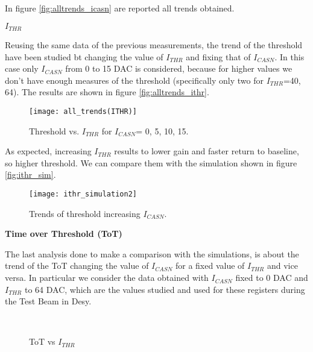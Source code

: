 In figure \vref{fig:alltrends_icasn} are reported all trends obtained.


\begin{description}
\item[\textbf{$I_{THR}$}]
\end{description}

Reusing the same data of the previous measurements, the trend of the threshold have been studied bt changing the value of $I_{THR}$ and fixing that of $I_{CASN}$. In this case only $I_{CASN}$ from 0 to 15 DAC is considered, because for higher values we don't have enough measures of the threshold (specifically only two for $I_{THR}$=40, 64). The results are shown in figure \vref{fig:alltrends_ithr}.

\begin{figure}[h!]
\centering
\texttt{[image: all\_trends(ITHR)]}
\caption{Threshold vs. $I_{THR}$ for $I_{CASN}$= 0, 5, 10, 15.}
\label{fig:alltrends_ithr}
\end{figure}

As expected, increasing $I_{THR}$ results to lower gain and faster return to baseline, so higher threshold. 
We can compare them with the simulation shown in figure \vref{fig:ithr_sim}. 

\begin{figure}[h!]
\centering
\texttt{[image: ithr\_simulation2]}
\caption{Trends of threshold increasing $I_{CASN}$.}
\label{fig:ithr_sim}
\end{figure}

\begin{description}
\item[\textbf{Time over Threshold (ToT)}]
\end{description}

The last analysis done to make a comparison with the simulations, is about the trend of the ToT changing the value of $I_{CASN}$ for a fixed value of $I_{THR}$ and vice versa. In particular we consider the data obtained with $I_{CASN}$ fixed to 0 DAC and $I_{THR}$ to 64 DAC, which are the values studied and used for these registers during the Test Beam in Desy.

\begin{figure}[h!]
\centering
{}\quad
{}\\
\caption{ToT vs $I_{THR}$}
\label{fig:tot_vs_ithr}
\end{figure}

